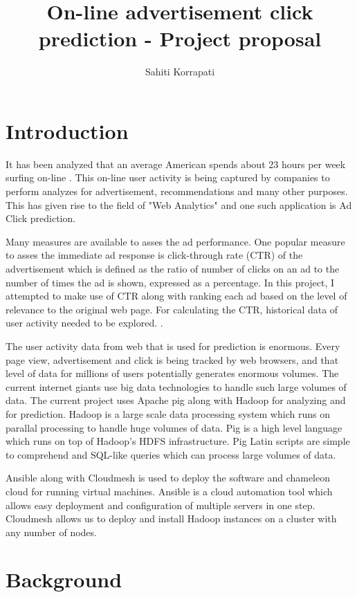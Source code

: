 \documentclass[9pt,twocolumn,twoside]{../../styles/osajnl}
\title{ On-line advertisement click prediction - Project proposal }
\author[1,*]{Sahiti Korrapati}
\affil[1]{School of Informatics and Computing, Bloomington, IN 47408, U.S.A.}
\affil[*]{Corresponding authors: sakorrap@iu.edu, S17-IR-2013}
\begin{document}
\maketitle

\section{Introduction}
It has been analyzed that an average American spends about 23 hours per week surfing on-line \cite{news-social-media}. This on-line user activity is being captured by companies to perform analyzes for advertisement, recommendations and many other purposes. This has given rise to the field of "Web Analytics" and one such application is Ad Click prediction.

Many measures are available to asses the ad performance. One popular measure to asses the immediate ad response is click-through rate (CTR) of the advertisement \cite{dictionary-clickThrough} which is defined as the ratio of number of clicks on an ad to the number of times the ad is shown, expressed as a percentage. In this project, I attempted to make use of CTR along with ranking each ad based on the level of relevance to the original web page. For calculating the CTR, historical data of user activity needed to be explored. \cite{wiki-clickThrough}.

The user activity data from web that is used for prediction is enormous. Every page view, advertisement and click is being tracked by web browsers, and that level of data for millions of users potentially generates enormous volumes. The current internet giants use big data technologies to handle such large volumes of data. The current project uses Apache pig along with Hadoop for analyzing and for prediction. Hadoop is a large scale data processing system which runs on parallal processing to handle huge volumes of data. Pig is a high level language which runs on top of Hadoop's HDFS infrastructure. Pig Latin scripts are simple to comprehend and SQL-like queries which can process large volumes of data.

Ansible along with Cloudmesh is used to deploy the software and chameleon cloud for running virtual machines. Ansible is a cloud automation tool which allows easy deployment and configuration of multiple servers in one step. Cloudmesh allows us to deploy and install Hadoop instances on a cluster with any number of nodes.

\section{Background}
\end{document}
